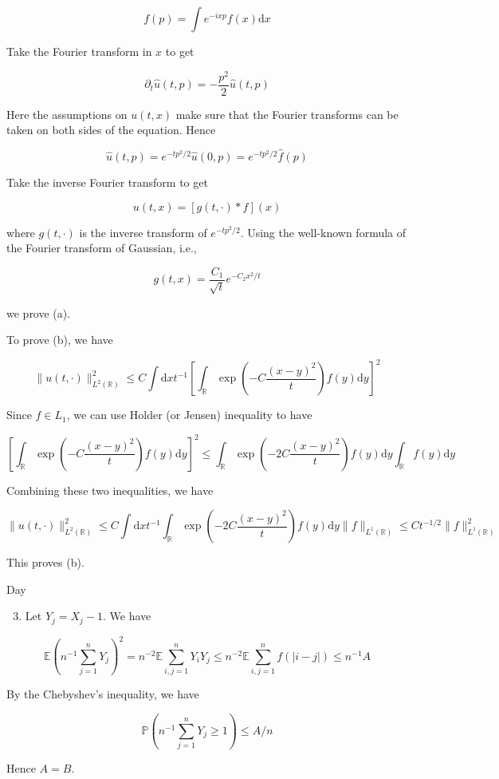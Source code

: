 \documentclass[10pt]{article}
\begin{document}
$$
f(p)=\int e^{-i x p} f(x) \mathrm{d} x
$$

Take the Fourier transform in $x$ to get

$$
\partial_{t} \hat{u}(t, p)=-\frac{p^{2}}{2} \hat{u}(t, p)
$$

Here the assumptions on $u(t, x)$ make sure that the Fourier transforms can be taken on both sides of the equation. Hence

$$
\hat{u}(t, p)=e^{-t p^{2} / 2} \hat{u}(0, p)=e^{-t p^{2} / 2} \hat{f}(p)
$$

Take the inverse Fourier transform to get

$$
u(t, x)=[g(t, \cdot) * f](x)
$$

where $g(t, \cdot)$ is the inverse transform of $e^{-t p^{2} / 2}$. Using the well-known formula of the Fourier transform of Gaussian, i.e.,

$$
g(t, x)=\frac{C_{1}}{\sqrt{t}} e^{-C_{2} x^{2} / t}
$$

we prove (a).

To prove (b), we have

$$
\|u(t, \cdot)\|_{L^{2}(\mathbb{R})}^{2} \leq C \int \mathrm{d} x t^{-1}\left[\int_{\mathbb{R}} \exp \left(-C \frac{(x-y)^{2}}{t}\right) f(y) \mathrm{d} y\right]^{2}
$$

Since $f \in L_{1}$, we can use Holder (or Jensen) inequality to have

$$
\left[\int_{\mathbb{R}} \exp \left(-C \frac{(x-y)^{2}}{t}\right) f(y) \mathrm{d} y\right]^{2} \leq \int_{\mathbb{R}} \exp \left(-2 C \frac{(x-y)^{2}}{t}\right) f(y) \mathrm{d} y \int_{\mathbb{R}} f(y) \mathrm{d} y
$$

Combining these two inequalities, we have

$$
\|u(t, \cdot)\|_{L^{2}(\mathbb{R})}^{2} \leq C \int \mathrm{d} x t^{-1} \int_{\mathbb{R}} \exp \left(-2 C \frac{(x-y)^{2}}{t}\right) f(y) \mathrm{d} y\|f\|_{L^{1}(\mathbb{R})} \leq C t^{-1 / 2}\|f\|_{L^{1}(\mathbb{R})}^{2}
$$

This proves (b).

Day

\begin{enumerate}
  \setcounter{enumi}{2}
  \item Let $Y_{j}=X_{j}-1$. We have
\end{enumerate}

$$
\mathbb{E}\left(n^{-1} \sum_{j=1}^{n} Y_{j}\right)^{2}=n^{-2} \mathbb{E} \sum_{i, j=1}^{n} Y_{i} Y_{j} \leq n^{-2} \mathbb{E} \sum_{i, j=1}^{n} f(|i-j|) \leq n^{-1} A
$$

By the Chebyshev's inequality, we have

$$
\mathbb{P}\left(n^{-1} \sum_{j=1}^{n} Y_{j} \geq 1\right) \leq A / n
$$

Hence $A=B$.
\end{document}
